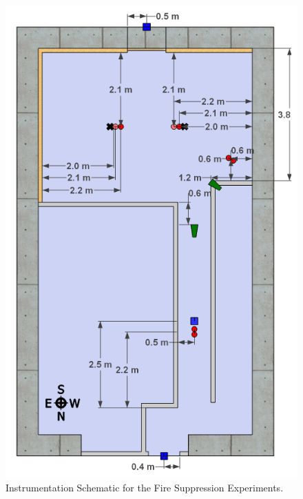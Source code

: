 \documentclass[12pt,oneside]{book}
\begin{document}
\begin{figure}[!ht]
	\includegraphics[width=.8\columnwidth]{../Figures/Pictures/DelCoSingleStoryInstrumentationDimensions}
	\caption{Instrumentation Schematic for the Fire Suppression Experiments.}
	\label{fig:Fire_Suppression_Instrumentation_Dimensions}
\end{figure}

\clearpage



\end{document}
